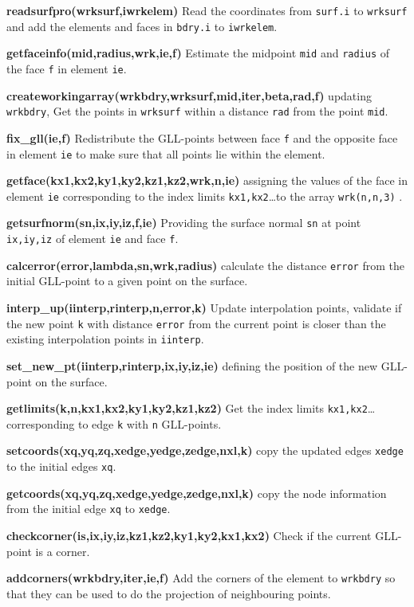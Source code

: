 \textbf{readsurfpro(wrksurf,iwrkelem)} Read the coordinates from \verb|surf.i| to \verb|wrksurf| and add the elements and faces in \verb|bdry.i| to \verb|iwrkelem|.

\textbf{getfaceinfo(mid,radius,wrk,ie,f)} Estimate the midpoint \verb|mid| and \verb|radius| of the face \verb|f| in element \verb|ie|. 

\textbf{createworkingarray(wrkbdry,wrksurf,mid,iter,beta,rad,f)} updating \verb|wrkbdry|, Get the points in \verb|wrksurf| within a distance \verb|rad| from the point \verb|mid|. 

\textbf{fix\_gll(ie,f)} Redistribute the GLL-points between face \verb|f| and the opposite face in element \verb|ie| to make sure that all points lie within the element.

\textbf{getface(kx1,kx2,ky1,ky2,kz1,kz2,wrk,n,ie)} assigning the values of the face in element \verb|ie| corresponding to the index limits \verb|kx1,kx2|\ldots to the array \verb|wrk(n,n,3)| .

\textbf{getsurfnorm(sn,ix,iy,iz,f,ie)} Providing the surface normal \verb|sn| at point \verb|ix,iy,iz| of element \verb|ie| and face \verb|f|. 

\textbf{calcerror(error,lambda,sn,wrk,radius)} calculate the distance \verb|error| from the initial GLL-point to a given point on the surface.  

\textbf{interp\_up(iinterp,rinterp,n,error,k)} Update interpolation points, validate if the new point \verb|k| with distance \verb|error| from the current point is closer than the existing interpolation points in \verb|iinterp|. 

\textbf{set\_new\_pt(iinterp,rinterp,ix,iy,iz,ie)} defining the position of the new GLL-point on the surface.

\textbf{getlimits(k,n,kx1,kx2,ky1,ky2,kz1,kz2)} Get the index limits \verb|kx1,kx2|\ldots corresponding to edge \verb|k| with \verb|n| GLL-points.

\textbf{setcoords(xq,yq,zq,xedge,yedge,zedge,nxl,k)} copy the updated edges \verb|xedge| to the initial edges \verb|xq|.

\textbf{getcoords(xq,yq,zq,xedge,yedge,zedge,nxl,k)} copy the node information from the initial edge \verb|xq| to \verb|xedge|.

\textbf{checkcorner(is,ix,iy,iz,kz1,kz2,ky1,ky2,kx1,kx2)} Check if the current GLL-point is a corner.

\textbf{addcorners(wrkbdry,iter,ie,f)} Add the corners of the element to \verb|wrkbdry| so that they can be used to do the projection of neighbouring points.

